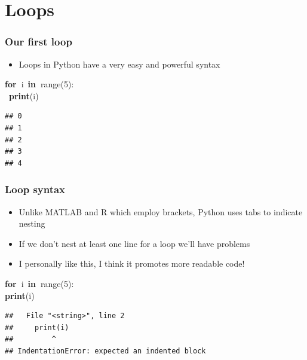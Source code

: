 \documentclass{beamer}\usepackage[]{graphicx}\usepackage[]{color}
\makeatletter
\newcommand{\hlnum}[1]{\textcolor[rgb]{0.686,0.059,0.569}{#1}}%
\newcommand{\hlopt}[1]{\textcolor[rgb]{0,0,0}{#1}}%
\newcommand{\hlstd}[1]{\textcolor[rgb]{0.345,0.345,0.345}{#1}}%
\newcommand{\hlkwa}[1]{\textcolor[rgb]{0.161,0.373,0.58}{\textbf{#1}}}%
\newcommand{\hlkwb}[1]{\textcolor[rgb]{0.69,0.353,0.396}{#1}}%
\newenvironment{kframe}{%
 \def\at@end@of@kframe{}%
 \ifinner\ifhmode%
  \def\at@end@of@kframe{\end{minipage}}%
  \begin{minipage}{\columnwidth}%
 \fi\fi%
 \def\FrameCommand##1{\hskip\@totalleftmargin \hskip-\fboxsep
 \colorbox{shadecolor}{##1}\hskip-\fboxsep
     \hskip-\linewidth \hskip-\@totalleftmargin \hskip\columnwidth}%
 \MakeFramed {\advance\hsize-\width
   \@totalleftmargin\z@ \linewidth\hsize
   \@setminipage}}%
 {\par\unskip\endMakeFramed%
 \at@end@of@kframe}
\newenvironment{knitrout}{}{} %
\makeatother
\begin{document}
\section{Loops}

\begin{frame}[fragile]
\frametitle{Our first loop}
\begin{itemize}
	\item Loops in Python have a very easy and powerful syntax

\end{itemize}
\begin{knitrout}
\color{fgcolor}\begin{kframe}
\noindent
\ttfamily
\hlstd{}\hlkwa{for\ }\hlstd{i\ }\hlkwa{in\ }\hlstd{}\hlkwb{range}\hlstd{}\hlopt{(}\hlstd{}\hlnum{5}\hlstd{}\hlopt{):}\hspace*{\fill}\\
\hlstd{\ }\hlkwa{print}\hlstd{}\hlopt{(}\hlstd{i}\hlopt{)}\hlstd{}\hspace*{\fill}
\mbox{}
\normalfont

\begin{verbatim}
## 0
## 1
## 2
## 3
## 4
\end{verbatim}
\end{kframe}
\end{knitrout}

\end{frame}

\begin{frame}[fragile]
\frametitle{Loop syntax}
\begin{itemize}
	\item Unlike MATLAB and R which employ brackets, Python uses tabs to indicate nesting

	\item If we don't nest at least one line for a loop we'll have problems

	\item I personally like this, I think it promotes more readable code!

\end{itemize}
\begin{knitrout}
\color{fgcolor}\begin{kframe}
\noindent
\ttfamily
\hlstd{}\hlkwa{for\ }\hlstd{i\ }\hlkwa{in\ }\hlstd{}\hlkwb{range}\hlstd{}\hlopt{(}\hlstd{}\hlnum{5}\hlstd{}\hlopt{):}\hspace*{\fill}\\
\hlstd{}\hlkwa{print}\hlstd{}\hlopt{(}\hlstd{i}\hlopt{)}\hlstd{}\hspace*{\fill}
\mbox{}
\normalfont

\begin{verbatim}
##   File "<string>", line 2
##     print(i)
##         ^
## IndentationError: expected an indented block
\end{verbatim}
\end{kframe}
\end{knitrout}

\end{frame}
\end{document}
